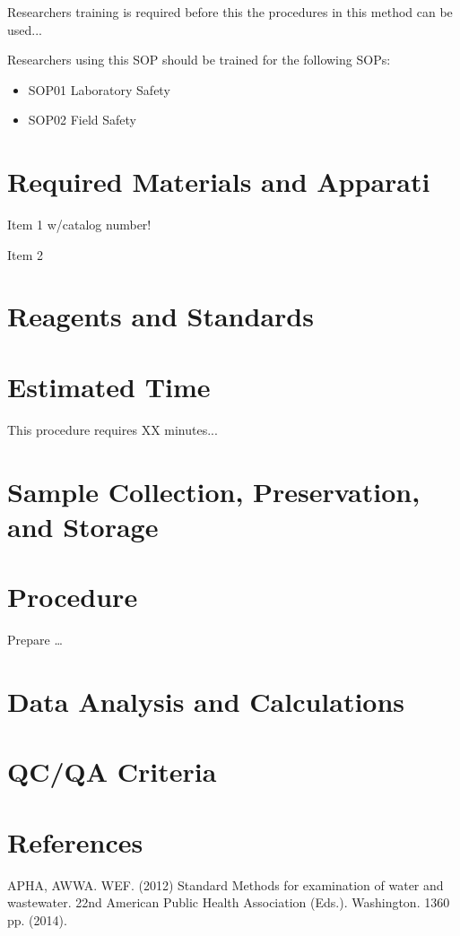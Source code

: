 \documentclass[12pt]{../SOP3_alpha}
\begin{document}
\NP Researchers training is required before this the procedures in this method can be used... 

\NP Researchers using this SOP should be trained for the following SOPs:

\begin{itemize}
  \item SOP01 Laboratory Safety
  \item SOP02 Field Safety
\end{itemize}

\section{Required Materials and Apparati}

\NP Item 1 w/catalog number!

\NP Item 2

\section{Reagents and Standards}

\section{Estimated Time}

\NP This procedure requires XX minutes...

\section{Sample Collection, Preservation, and Storage}

\section{Procedure}

\NP Prepare \dots

\NP

\section{Data Analysis and Calculations}

\section{QC/QA Criteria}

\section{References}

\NP APHA, AWWA. WEF. (2012) Standard Methods for examination of water and wastewater. 22nd American Public Health Association (Eds.). Washington. 1360 pp. (2014).
\end{document}
